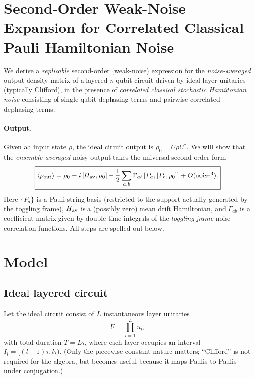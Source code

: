 \documentclass[11pt]{article}
\begin{document}
\section{Second-Order Weak-Noise Expansion for Correlated Classical Pauli Hamiltonian Noise}

We derive a \emph{replicable} second-order (weak-noise) expression for the \emph{noise-averaged} output density matrix of a layered $n$-qubit circuit driven by ideal layer unitaries (typically Clifford), in the presence of \emph{correlated classical stochastic Hamiltonian noise} consisting of single-qubit dephasing terms and pairwise correlated dephasing terms.

\paragraph{Output.}
Given an input state $\rho$, the ideal circuit output is $\rho_0=U\rho U^\dagger$. We will show that the \emph{ensemble-averaged} noisy output takes the universal second-order form
\begin{equation}
\boxed{
\langle\rho_{\rm out}\rangle
=
\rho_0
- i\,[H_{\rm av},\rho_0]
-\frac12\sum_{a,b}\Gamma_{ab}\,[P_a,[P_b,\rho_0]]
+ O(\text{noise}^3).
}
\label{eq:main}
\end{equation}
Here $\{P_a\}$ is a Pauli-string basis (restricted to the support actually generated by the toggling frame), $H_{\rm av}$ is a (possibly zero) mean drift Hamiltonian, and $\Gamma_{ab}$ is a coefficient matrix given by double time integrals of the \emph{toggling-frame} noise correlation functions. All steps are spelled out below.

\section{Model}

\subsection{Ideal layered circuit}
Let the ideal circuit consist of $L$ instantaneous layer unitaries
\begin{equation}
U=\prod_{l=1}^{L}u_l,
\end{equation}
with total duration $T=L\tau$, where each layer occupies an interval $I_l=[(l-1)\tau,l\tau)$.
(Only the piecewise-constant nature matters; ``Clifford'' is not required for the algebra, but becomes useful because it maps Paulis to Paulis under conjugation.)
\end{document}
